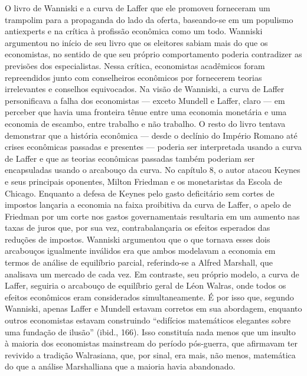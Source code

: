 \documentclass[12pt]{article}
\begin{document}
O livro de Wanniski e a curva de Laffer que ele promoveu forneceram um trampolim para a propaganda do lado da oferta, baseando-se em um populismo antiexperts e na crítica à profissão econômica como um todo. Wanniski argumentou no início de seu livro que os eleitores sabiam mais do que os economistas, no sentido de que seu próprio comportamento poderia contradizer as previsões dos especialistas. Nessa crítica, economistas acadêmicos foram repreendidos junto com conselheiros econômicos por fornecerem teorias irrelevantes e conselhos equivocados. Na visão de Wanniski, a curva de Laffer personificava a falha dos economistas — exceto Mundell e Laffer, claro — em perceber que havia uma fronteira tênue entre uma economia monetária e uma economia de escambo, entre trabalho e não trabalho. O resto do livro tentava demonstrar que a história econômica — desde o declínio do Império Romano até crises econômicas passadas e presentes — poderia ser interpretada usando a curva de Laffer e que as teorias econômicas passadas também poderiam ser encapsuladas usando o arcabouço da curva. No capítulo 8, o autor atacou Keynes e seus principais oponentes, Milton Friedman e os monetaristas da Escola de Chicago. Enquanto a defesa de Keynes pelo gasto deficitário sem cortes de impostos lançaria a economia na faixa proibitiva da curva de Laffer, o apelo de Friedman por um corte nos gastos governamentais resultaria em um aumento nas taxas de juros que, por sua vez, contrabalançaria os efeitos esperados das reduções de impostos. Wanniski argumentou que o que tornava esses dois arcabouços igualmente inválidos era que ambos modelavam a economia em termos de análise de equilíbrio parcial, referindo-se a Alfred Marshall, que analisava um mercado de cada vez. Em contraste, seu próprio modelo, a curva de Laffer, seguiria o arcabouço de equilíbrio geral de Léon Walras, onde todos os efeitos econômicos eram considerados simultaneamente. É por isso que, segundo Wanniski, apenas Laffer e Mundell estavam corretos em sua abordagem, enquanto outros economistas estavam construindo ``edifícios matemáticos elegantes sobre uma fundação de ilusão'' (ibid., 166). Isso constituía nada menos que um insulto à maioria dos economistas mainstream do período pós-guerra, que afirmavam ter revivido a tradição Walrasiana, que, por sinal, era mais, não menos, matemática do que a análise Marshalliana que a maioria havia abandonado.
\end{document}
